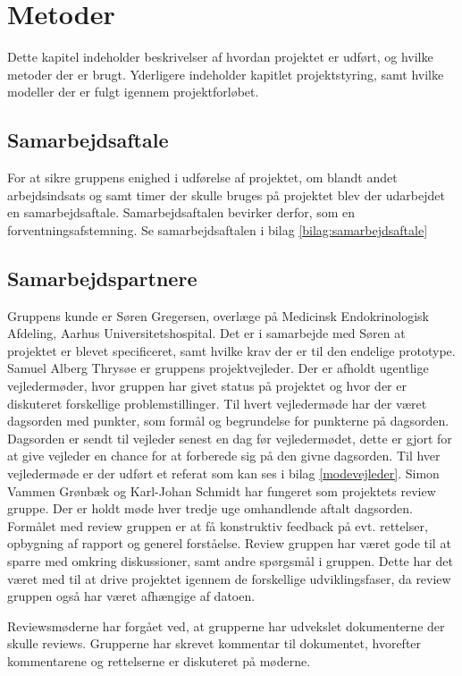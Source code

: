 \chapter{Metoder}
Dette kapitel indeholder beskrivelser af hvordan projektet er udført, og hvilke metoder der er brugt. Yderligere indeholder kapitlet projektstyring, samt hvilke modeller der er fulgt igennem projektforløbet. 

\section{Samarbejdsaftale}
For at sikre gruppens enighed i udførelse af projektet, om blandt andet arbejdsindsats og samt timer der skulle bruges på projektet blev der udarbejdet en samarbejdsaftale. Samarbejdsaftalen bevirker derfor, som en forventningsafstemning. Se samarbejdsaftalen i bilag \ref{bilag:samarbejdsaftale}

\section{Samarbejdspartnere}
Gruppens kunde er Søren Gregersen, overlæge på Medicinsk Endokrinologisk Afdeling, Aarhus Universitetshospital. Det er i samarbejde med Søren at projektet er blevet specificeret, samt hvilke krav der er til den endelige prototype.
Samuel Alberg Thrysøe er gruppens projektvejleder. Der er afholdt ugentlige vejledermøder, hvor gruppen har givet status på projektet og hvor der er diskuteret forskellige problemstillinger. Til hvert vejledermøde har der været dagsorden med punkter, som formål og begrundelse for punkterne på dagsorden. Dagsorden er sendt til vejleder senest en dag før vejledermødet, dette er gjort for at give vejleder en chance for at forberede sig på den givne dagsorden. Til hver vejledermøde er der udført et referat som kan ses i bilag \ref{modevejleder}.
Simon Vammen Grønbæk og Karl-Johan Schmidt har fungeret som projektets review gruppe. Der er holdt møde hver tredje uge omhandlende aftalt dagsorden. Formålet med review gruppen er at få konstruktiv feedback på evt. rettelser, opbygning af rapport og generel forståelse. Review gruppen har været gode til at sparre med omkring diskussioner, samt andre spørgsmål i gruppen. Dette har det været med til at drive projektet igennem de forskellige udviklingsfaser, da review gruppen også har været afhængige af datoen.

Reviewsmøderne har forgået ved, at grupperne har udvekslet dokumenterne der skulle reviews. Grupperne har skrevet kommentar til dokumentet, hvorefter kommentarene og rettelserne er diskuteret på møderne. 

